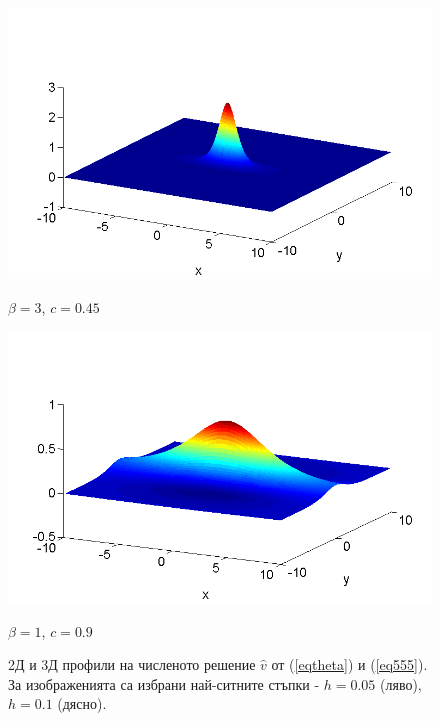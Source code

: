 \documentclass[a4paper]{article}
\newcommand{\rf}[1]{(\ref{#1})}
\theoremstyle{remark}
\begin{document}
\begin{large}
\begin{figure}[ht]
\begin{minipage}[b]{0.5\linewidth}
	\end{minipage}
	\begin{minipage}[b]{0.5\linewidth}
		 \raggedleft
		\includegraphics[width=\linewidth]{SolutionView/ChristovIC_30_bt3_c045_prpview.png}		
		\centerline{$\beta = 3$, $c = 0.45$ }
	\end{minipage}
	\begin{minipage}[b]{0.5\linewidth}
		 \raggedright
		\includegraphics[width=\linewidth]{SolutionView/ChristovIC_128_bt1_c090_prpview.png}
		\centerline{$\beta = 1$, $c = 0.9$}
	\end{minipage}
	\caption{2Д и 3Д профили на численото решение $\widehat v$ от \rf{eqtheta} и \rf{eq555}. За изображенията са избрани най-ситните стъпки - $h=0.05$ (ляво), $h=0.1$ (дясно).}
	\label{fig:solutions}
\end{figure}
\FloatBarrier

\end{large}
\end{document}
